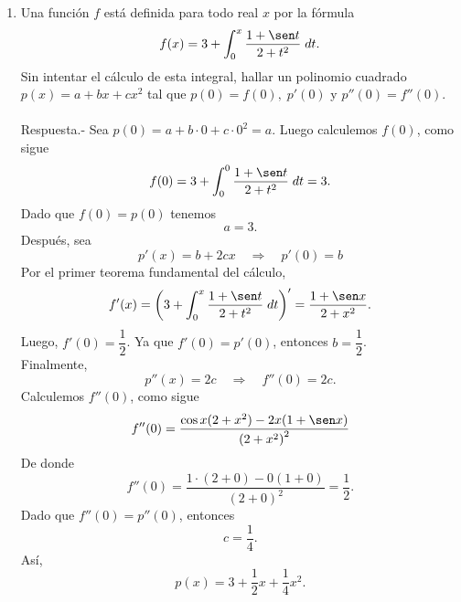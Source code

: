 \begin{enumerate}[\bfseries 1.]
    \item Una función $f$ está definida para todo real $x$ por la fórmula
    $$f(x)=3+\int_0^x \dfrac{1+\sen t}{2+t^2}\; dt.$$
    Sin intentar el cálculo de esta integral, hallar un polinomio cuadrado $p(x)=a+bx+cx^2$ tal que $p(0)=f(0),\; p'(0)$ y $p''(0)=f''(0).$\\\\
	Respuesta.-\; Sea $p(0)=a+b\cdot 0 + c \cdot 0^2=a$. Luego calculemos $f(0)$, como sigue
	$$f(0)=3+\int_0^0 \dfrac{1+\sen t}{2+t^2}\; dt=3.$$
	Dado que $f(0)=p(0)$ tenemos
	$$a=3.$$
	Después, sea 
	$$p'(x)=b+2cx \quad \Rightarrow \quad p'(0)=b$$
	Por el primer teorema fundamental del cálculo, 
	$$f'(x)=\displaystyle\left(3+\int_0^x \dfrac{1+\sen t}{2+t^2}\; dt\right)'=\dfrac{1+\sen x}{2+x^2}.$$
	Luego, $f'(0)=\dfrac{1}{2}$. Ya que $f'(0)=p'(0)$, entonces $b=\dfrac{1}{2}$.\\
	Finalmente, 
	$$p''(x)=2c\quad \Rightarrow \quad f''(0)=2c.$$
	Calculemos $f''(0)$, como sigue
	$$f''(0)=\dfrac{\cos x(2+x^2)-2x(1+\sen x)}{\left(2+x^2\right)^2}$$
	De donde 
	$$f''(0)=\dfrac{1\cdot (2+0)-0(1+0)}{(2+0)^2}=\dfrac{1}{2}.$$
	Dado que $f''(0)=p''(0)$, entonces 
	$$c=\dfrac{1}{4}.$$
	Así,
	$$p(x)=3+\dfrac{1}{2}x+\dfrac{1}{4}x^2.$$\\


\end{enumerate}
